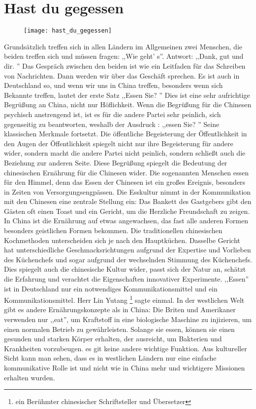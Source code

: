 \section{Hast du gegessen}
\begin{figure}[h]
\centering
\texttt{[image: hast\_du\_gegessen]}
\caption{}
\label{fig:hast_du_gegessen}
\end{figure}
Grundsätzlich treffen sich in allen Ländern im Allgemeinen zwei Menschen,  die beiden treffen sich und müssen fragen: ,,Wie geht' s''. Antwort: ,,Dank,  gut und dir. '' Das Gespräch zwischen den beiden ist wie ein Leitfaden für das Schreiben von Nachrichten.  Dann werden wir über das Geschäft sprechen.  Es ist auch in Deutschland so, und wenn wir uns in China treffen, besonders wenn sich Bekannte treffen, lautet der erste Satz ,,Essen Sie? '' Dies ist eine sehr aufrichtige Begrü\ss ung an China, nicht nur Höflichkeit.
\mypar
Wenn die Begrü\ss ung für die Chinesen psychisch anstrengend ist, ist es für die andere Partei sehr peinlich, sich gegenseitig zu beantworten, weshalb der Ausdruck : ,,essen Sie? '' Seine klassischen Merkmale fortsetzt. Die öffentliche Begeisterung der Öffentlichkeit in den Augen der Öffentlichkeit spiegelt nicht nur ihre Begeisterung für andere wider, sondern macht die andere Partei nicht peinlich, sondern schlie\ss t auch die Beziehung zur anderen Seite.
\mypar
Diese Begrü\ss ung spiegelt die Bedeutung der chinesischen Ernährung für die Chinesen wider. Die sogenannten Menschen essen für den Himmel, denn das Essen der Chinesen ist ein gro\ss es Ereignis, besonders in Zeiten von Versorgungsengpässen. Die Esskultur nimmt in der Kommunikation mit den Chinesen eine zentrale Stellung ein: Das Bankett des Gastgebers gibt den Gästen oft einen Toast und ein Gericht, um die Herzliche Freundschaft  zu zeigen. In China ist die Ernährung auf etwas angewachsen, das fast alle anderen Formen besonders geistlichen Formen bekommen.
\mypar
Die traditionellen chinesischen Kochmethoden unterscheiden sich je nach den Hauptküchen. Dasselbe Gericht hat unterschiedliche Geschmacksrichtungen aufgrund der Expertise und Vorlieben des Küchenchefs und sogar aufgrund der wechselnden Stimmung des Küchenchefs. Dies spiegelt auch die chinesische Kultur wider, passt sich der Natur an, schätzt die Erfahrung und verachtet die Eigenschaften innovativer Experimente.
\mypar
,,Essen'' ist in Deutschland nur ein notwendiges Kommunikationsmittel und ein Kommunikationsmittel. Herr Lin Yutang \footnote{ein Berühmter chinesischer Schriftsteller und Übersetzer} sagte einmal. In der westlichen Welt gibt es andere Ernährungskonzepte als in China: Die Briten und Amerikaner verwenden nur ,,eat'', um Kraftstoff in eine biologische Maschine zu injizieren, um einen normalen Betrieb zu gewährleisten. Solange sie essen, können sie einen gesunden und starken Körper erhalten, der ausreicht, um Bakterien und Krankheiten vorzubeugen. es git keine andere wichtige Funktion.  Aus kultureller Sicht kann man sehen, dass es in westlichen Ländern nur eine einfache kommunikative Rolle ist und nicht wie in China mehr und wichtigere Missionen erhalten wurden.

